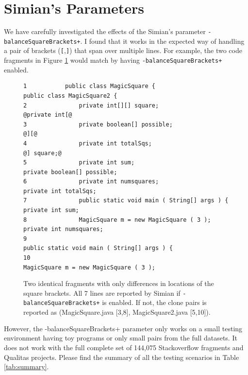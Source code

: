 \documentclass{IEEEtran}
\begin{document}
\section*{Simian's Parameters}

We have carefully investigated the effects of the Simian's parameter \texttt{-balanceSquareBrackets+}. I found that it works in the expected way of handling a pair of brackets (\texttt{[},\texttt{]}) that span over multiple lines. For example, the two code fragments in Figure \ref{fig:two_frags} would match by having \texttt{-balanceSquareBrackets+} enabled.

\noindent\begin{figure}[H]
	\scriptsize
	\begin{lstlisting}[frame=single,style=base]
1           public class MagicSquare {                             public class MagicSquare2 {
2               private int[][] square;                                @private int[@
3               private boolean[] possible;                                        @][@
4               private int totalSqs;                                              @] square;@
5               private int sum;                                       private boolean[] possible;
6               private int numsquares;                                private int totalSqs;
7               public static void main ( String[] args ) {            private int sum;
8               MagicSquare m = new MagicSquare ( 3 );                 private int numsquares;
9                                                                      public static void main ( String[] args ) {
10                                                                     MagicSquare m = new MagicSquare ( 3 );
	\end{lstlisting}
	\caption{Two identical fragments with only differences in locations of the square brackets. All 7 lines are reported by Simian if \small\texttt{-balanceSquareBrackets+} \normalsize is enabled. If not, the clone pairs is reported as \newline (MagicSquare.java [3,8], MagicSquare2.java [5,10]).} 
	\label{fig:two_frags}
\end{figure}

However, the -balanceSquareBrackets+ parameter only works on a small testing environment having toy programs or only small pairs from the full datasets. It does not work with the full complete set of 144,075 Stackoverflow fragments and Qualitas projects. Please find the summary of all the testing scenarios in Table \ref{tab:summary}. %
\end{document}
